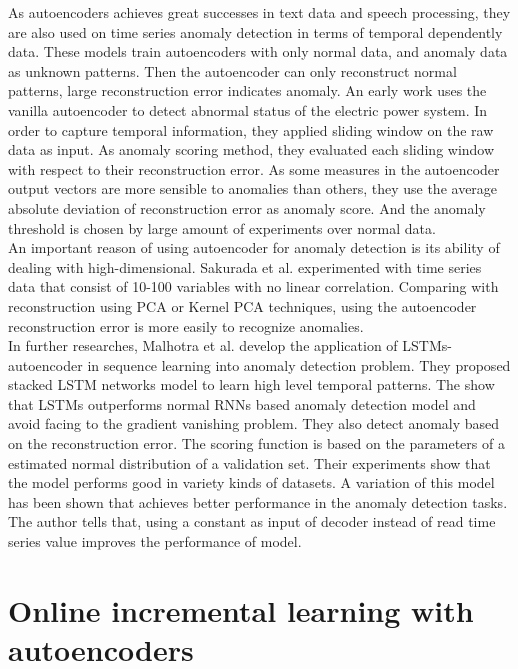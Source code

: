 As autoencoders achieves great successes in text data and speech processing, they are also used on time series anomaly detection in terms of temporal dependently data. These models train autoencoders with only normal data, and anomaly data as unknown patterns. Then the autoencoder can only reconstruct normal patterns, large reconstruction error indicates anomaly. An early work \cite{eps} uses the vanilla autoencoder to detect abnormal status of the electric power system. In order to capture temporal information, they applied sliding window on the raw data as input. As anomaly scoring method, they evaluated each sliding window with respect to their reconstruction error. As some measures in the autoencoder output vectors are more sensible to anomalies than others, they use the average absolute deviation of reconstruction error as anomaly score. And the anomaly threshold is chosen by large amount of experiments over normal data.\\

An important reason of using autoencoder for anomaly detection is its ability of dealing with high-dimensional. Sakurada et al. \cite{ dimensionalityreduction} experimented with time series data that consist of 10-100 variables with no linear correlation. Comparing with reconstruction using PCA or Kernel PCA techniques, using the autoencoder reconstruction error is more easily to recognize anomalies.\\

In further researches, Malhotra et al. \cite{lstmad}\cite{encdecad} develop the application of LSTMs-autoencoder in sequence learning into anomaly detection problem. They proposed stacked LSTM networks model to learn high level temporal patterns. The show that LSTMs outperforms normal RNNs based anomaly detection model and avoid facing to the gradient vanishing problem. They also detect anomaly based on the reconstruction error. The scoring function is based on the parameters of a estimated normal distribution of a validation set. Their experiments show that the model performs good in variety kinds of datasets. A variation of this model \cite{timenet} has been shown that achieves better performance in the anomaly detection tasks. The author tells that, using a constant as input of decoder instead of read time series value improves the performance of model.


\section{Online incremental learning with autoencoders}
\label{sec:Online incremental learning with autoencoders}

